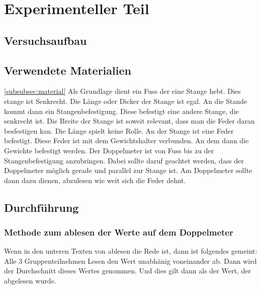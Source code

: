 \documentclass[../main.tex]{subfiles} %
\begin{document}
\section{Experimenteller Teil}\label{sec:experimenteller-teil}
    \subsection{Versuchsaufbau}\label{subsec:versuchsaufbau}

    \subsection{Verwendete Materialien}\ref{subsubsec:material}\label{zu der Materialliste}
        Als Grundlage dient ein Fuss der eine Stange hebt. Dies stange ist Senkrecht.
        Die Länge oder Dicker der Stange ist egal. An die Stande kommt dann ein Stangenbefestigung.
        Diese befestigt eine andere Stange, die senkrecht ist.
        Die Breite der Stange ist soweit relevant, dass man die Feder daran besfestigen kan. Die Länge spielt keine Rolle.
        An der Stange ist eine Feder befestigt. Diese Feder ist mit dem Gewichtshalter verbunden.
        An dem dann die Gewichte befestigt werden.
        Der Doppelmeter ist von Fuss bis zu der Stangenbefestigung anzubringen. Dabei sollte daruf geachtet werden, dass der Doppelmeter möglich gerade und parallel zur Stange ist.
        Am Doppelmeter sollte dann dazu dienen, abzulesen wie weit sich die Feder dehnt.

        \subsection{Durchführung}\label{subsec:durchfuhrung}

        \subsubsection{Methode zum ablesen der Werte auf dem Doppelmeter}\label{subsubsec:methode-zum-ablesen-der-werte-auf-dem-doppelmeter}

        Wenn in den unteren Texten von ablesen die Rede ist, dann ist folgendes gemeint:
        Alle 3 Gruppenteilnehmen Lesen den Wert unabhänig voneinander ab. Dann wird der Durchschnitt dieses Wertes genommen. Und dies gilt dann als der Wert, der abgelesen wurde.
\end{document}
